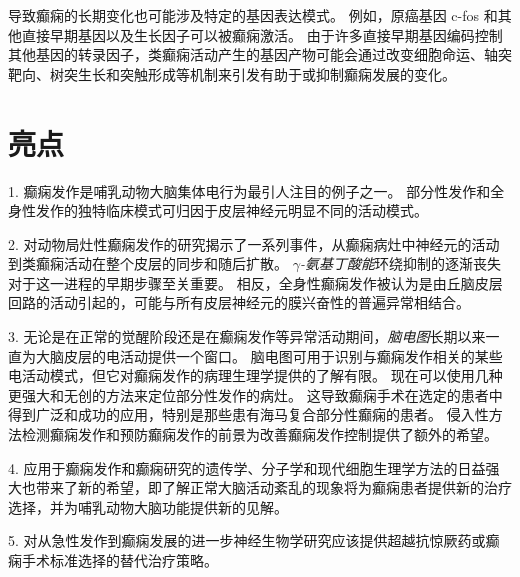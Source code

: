 导致癫痫的长期变化也可能涉及特定的基因表达模式。
例如，原癌基因 c-fos 和其他直接早期基因以及生长因子可以被癫痫激活。
由于许多直接早期基因编码控制其他基因的转录因子，类癫痫活动产生的基因产物可能会通过改变细胞命运、轴突靶向、树突生长和突触形成等机制来引发有助于或抑制癫痫发展的变化。



\section{亮点}

1. 癫痫发作是哺乳动物大脑集体电行为最引人注目的例子之一。
部分性发作和全身性发作的独特临床模式可归因于皮层神经元明显不同的活动模式。


2. 对动物局灶性癫痫发作的研究揭示了一系列事件，从癫痫病灶中神经元的活动到类癫痫活动在整个皮层的同步和随后扩散。
\textit{$\gamma$-氨基丁酸能}环绕抑制的逐渐丧失对于这一进程的早期步骤至关重要。
相反，全身性癫痫发作被认为是由丘脑皮层回路的活动引起的，可能与所有皮层神经元的膜兴奋性的普遍异常相结合。


3. 无论是在正常的觉醒阶段还是在癫痫发作等异常活动期间，\textit{脑电图}长期以来一直为大脑皮层的电活动提供一个窗口。
脑电图可用于识别与癫痫发作相关的某些电活动模式，但它对癫痫发作的病理生理学提供的了解有限。
现在可以使用几种更强大和无创的方法来定位部分性发作的病灶。
这导致癫痫手术在选定的患者中得到广泛和成功的应用，特别是那些患有海马复合部分性癫痫的患者。
侵入性方法检测癫痫发作和预防癫痫发作的前景为改善癫痫发作控制提供了额外的希望。


4. 应用于癫痫发作和癫痫研究的遗传学、分子学和现代细胞生理学方法的日益强大也带来了新的希望，即了解正常大脑活动紊乱的现象将为癫痫患者提供新的治疗选择，并为哺乳动物大脑功能提供新的见解。


5. 对从急性发作到癫痫发展的进一步神经生物学研究应该提供超越抗惊厥药或癫痫手术标准选择的替代治疗策略。

